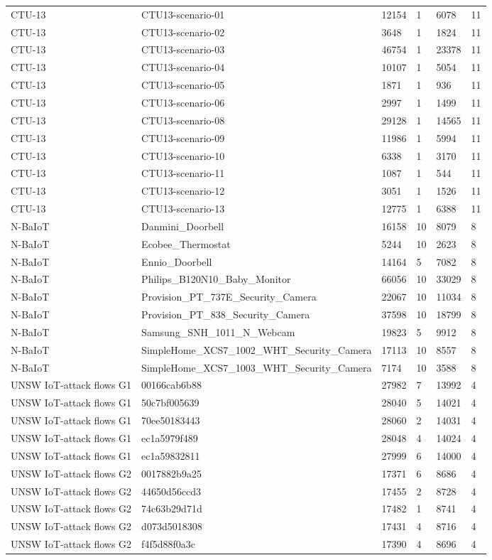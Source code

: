 \begin{tabular}{llllll}
CTU-13 & CTU13-scenario-01 & 12154 & 1 & 6078 & 11 \\
CTU-13 & CTU13-scenario-02 & 3648 & 1 & 1824 & 11 \\
CTU-13 & CTU13-scenario-03 & 46754 & 1 & 23378 & 11 \\
CTU-13 & CTU13-scenario-04 & 10107 & 1 & 5054 & 11 \\
CTU-13 & CTU13-scenario-05 & 1871 & 1 & 936 & 11 \\
CTU-13 & CTU13-scenario-06 & 2997 & 1 & 1499 & 11 \\
CTU-13 & CTU13-scenario-08 & 29128 & 1 & 14565 & 11 \\
CTU-13 & CTU13-scenario-09 & 11986 & 1 & 5994 & 11 \\
CTU-13 & CTU13-scenario-10 & 6338 & 1 & 3170 & 11 \\
CTU-13 & CTU13-scenario-11 & 1087 & 1 & 544 & 11 \\
CTU-13 & CTU13-scenario-12 & 3051 & 1 & 1526 & 11 \\
CTU-13 & CTU13-scenario-13 & 12775 & 1 & 6388 & 11 \\
N-BaIoT & Danmini\_Doorbell & 16158 & 10 & 8079 & 8 \\
N-BaIoT & Ecobee\_Thermostat & 5244 & 10 & 2623 & 8 \\
N-BaIoT & Ennio\_Doorbell & 14164 & 5 & 7082 & 8 \\
N-BaIoT & Philips\_B120N10\_Baby\_Monitor & 66056 & 10 & 33029 & 8 \\
N-BaIoT & Provision\_PT\_737E\_Security\_Camera & 22067 & 10 & 11034 & 8 \\
N-BaIoT & Provision\_PT\_838\_Security\_Camera & 37598 & 10 & 18799 & 8 \\
N-BaIoT & Samsung\_SNH\_1011\_N\_Webcam & 19823 & 5 & 9912 & 8 \\
N-BaIoT & SimpleHome\_XCS7\_1002\_WHT\_Security\_Camera & 17113 & 10 & 8557 & 8 \\
N-BaIoT & SimpleHome\_XCS7\_1003\_WHT\_Security\_Camera & 7174 & 10 & 3588 & 8 \\
UNSW IoT-attack flows G1 & 00166cab6b88 & 27982 & 7 & 13992 & 4 \\
UNSW IoT-attack flows G1 & 50c7bf005639 & 28040 & 5 & 14021 & 4 \\
UNSW IoT-attack flows G1 & 70ee50183443 & 28060 & 2 & 14031 & 4 \\
UNSW IoT-attack flows G1 & ec1a5979f489 & 28048 & 4 & 14024 & 4 \\
UNSW IoT-attack flows G1 & ec1a59832811 & 27999 & 6 & 14000 & 4 \\
UNSW IoT-attack flows G2 & 0017882b9a25 & 17371 & 6 & 8686 & 4 \\
UNSW IoT-attack flows G2 & 44650d56ccd3 & 17455 & 2 & 8728 & 4 \\
UNSW IoT-attack flows G2 & 74c63b29d71d & 17482 & 1 & 8741 & 4 \\
UNSW IoT-attack flows G2 & d073d5018308 & 17431 & 4 & 8716 & 4 \\
UNSW IoT-attack flows G2 & f4f5d88f0a3c & 17390 & 4 & 8696 & 4 \\
\bottomrule
\end{tabular}
